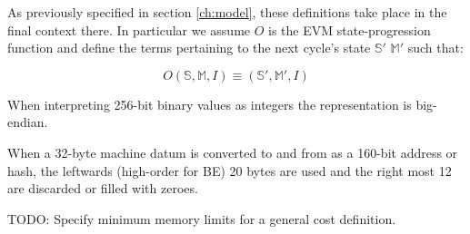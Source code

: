 \documentclass[9pt,oneside]{amsart}
\begin{document}
As previously specified in section \ref{ch:model}, these definitions take place in the final context there. In particular we assume $O$ is the EVM state-progression function and define the terms pertaining to the next cycle's state $\mathbb{S}'$ $\mathbb{M}'$ such that:

\begin{equation}
O(\mathbb{S}, \mathbb{M}, I) \equiv (\mathbb{S}', \mathbb{M}', I)
\end{equation}

When interpreting 256-bit binary values as integers the representation is big-endian.

When a 32-byte machine datum is converted to and from as a 160-bit address or hash, the leftwards (high-order for BE) 20 bytes are used and the right most 12 are discarded or filled with zeroes.

TODO: Specify minimum memory limits for a general cost definition.
\end{document}
